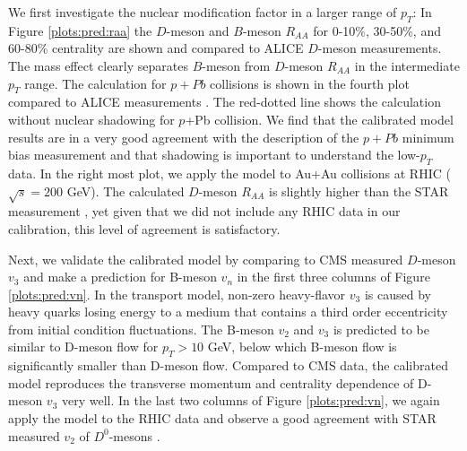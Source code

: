 \documentclass[aps, prc, reprint, amsmath, groupedaddress, nofootinbib]{revtex4-1}
\begin{document}
We first investigate the nuclear modification factor in a larger range of $p_T$:
In Figure \ref{plots:pred:raa} the $D$-meson and $B$-meson $R_{AA}$ for 0-10\%, 30-50\%, and 60-80\% centrality are shown and compared to ALICE $D$-meson measurements.
The mass effect clearly separates $B$-meson from $D$-meson $R_{AA}$ in the intermediate $p_T$ range. 
The calculation for $p+Pb$ collisions is shown in the fourth plot compared to ALICE measurements \cite{Abelev:2014hha}.
The red-dotted line shows the calculation without nuclear shadowing for $p$+Pb collision.
We find that the calibrated model results are in a very good agreement with the description of the $p+Pb$ minimum bias measurement and that shadowing  is important to understand the low-$p_T$ data.
In the right most plot, we apply the model to Au+Au collisions at RHIC  ($\sqrt{s} = 200$ GeV).
The calculated $D$-meson $R_{AA}$ is slightly higher than the STAR measurement \cite{Xie:2016iwq}, 
yet given that we did not include any RHIC data in our calibration, this level of agreement is satisfactory.

Next, we validate the calibrated model by comparing to CMS measured $D$-meson $v_3$ and make a prediction for B-meson $v_n$ in the first three columns of Figure \ref{plots:pred:vn}.
In the transport model, non-zero heavy-flavor $v_3$ is caused by heavy quarks losing energy to a medium that contains a third order eccentricity from initial condition fluctuations.
The B-meson $v_2$ and $v_3$ is predicted to be similar to D-meson flow for $p_T > 10$ GeV, below which B-meson flow is significantly smaller than D-meson flow.
Compared to CMS data, the calibrated model reproduces the transverse momentum and centrality dependence of D-meson $v_3$ very well.
In the last two columns of Figure \ref{plots:pred:vn}, we again apply the model to the RHIC data and observe a good agreement with STAR measured $v_2$ of $D^0$-mesons \cite{Adamczyk:2017xur}.
\end{document}
